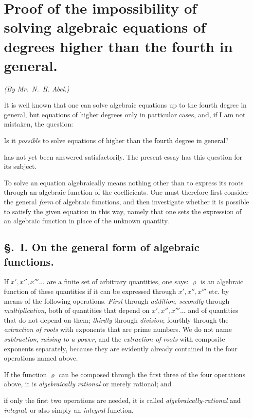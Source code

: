 \documentclass{article}
\begin{document}
\section*{Proof of the impossibility of solving algebraic equations of degrees higher than the fourth in general.}

\emph{(By Mr.~N.~H. Abel.)}

It is well known that one can solve algebraic equations up to the fourth degree in general, but equations of higher degrees only in particular cases, and, if I am not mistaken, the question:

Is it \emph{possible} to solve equations of higher than the fourth degree in general?

has not yet been answered satisfactorily. The present essay has this question for its subject.

To solve an equation algebraically means nothing other than to express its roots through an algebraic function of the coefficients. One must therefore first consider the general \emph{form} of algebraic functions, and then investigate whether it is possible to satisfy the given equation in this way, namely that one sets the expression of an algebraic function in place of the unknown quantity.

\subsection*{§.~I. On the general form of algebraic functions.}

If $x', x'', x''' \ldots$ are a finite set of arbitrary quantities, one says: $\varrho$ is an algebraic function of these quantities if it can be expressed through $x', x'', x''' $ etc. by means of the following operations. \emph{First} through \emph{addition}, \emph{secondly} through \emph{multiplication}, both of quantities that depend on $x', x'', x''' \ldots$ and of quantities that do not depend on them; \emph{thirdly} through \emph{division}; fourthly through the \emph{extraction of roots} with exponents that are prime numbers. We do not name \emph{subtraction}, \emph{raising to a power}, and the \emph{extraction of roots} with composite exponents separately, because they are evidently already contained in the four operations named above.

If the function $\varrho$ can be composed through the first three of the four operations above, it is \emph{algebraically rational} or merely rational; and

if only the first two operations are needed, it is called \emph{algebraically-rational} and \emph{integral}, or also simply an \emph{integral} function.
\end{document}
